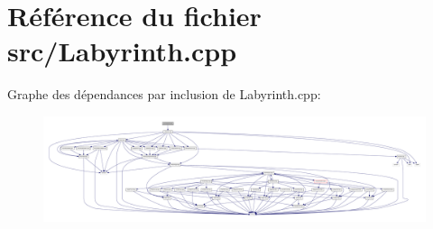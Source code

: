 \section{Référence du fichier src/\-Labyrinth.cpp}
\label{_labyrinth_8cpp}
Graphe des dépendances par inclusion de Labyrinth.\-cpp\-:
\nopagebreak
\begin{figure}[H]
\begin{center}
\leavevmode
\includegraphics[width=350pt]{_labyrinth_8cpp__incl}
\end{center}
\end{figure}
